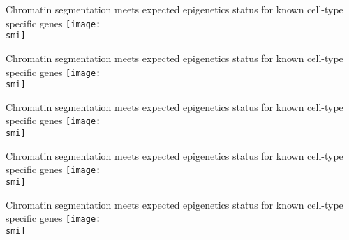 \documentclass[10pt]{beamer}
\def\smi{out/ln/updir/mw-gcthesis-oral/library.bib}
\begin{document}
    \begin{frame}{Chromatin segmentation meets expected epigenetics status for known cell-type specific genes}
      \def\smi{out/ln/updir/mw-gcthesis-oral/ink/chromatin-states/genome-view/t-lineage/2.pdf}
      \texttt{[image: \\smi]}
    \end{frame}
    \begin{frame}{Chromatin segmentation meets expected epigenetics status for known cell-type specific genes}
      \def\smi{out/ln/updir/mw-gcthesis-oral/ink/chromatin-states/genome-view/t-lineage/3.pdf}
      \texttt{[image: \\smi]}
    \end{frame}
    \begin{frame}{Chromatin segmentation meets expected epigenetics status for known cell-type specific genes}
      \def\smi{out/ln/updir/mw-gcthesis-oral/ink/chromatin-states/genome-view/t-lineage/4.pdf}
      \texttt{[image: \\smi]}
    \end{frame}
    \begin{frame}{Chromatin segmentation meets expected epigenetics status for known cell-type specific genes}
      \def\smi{out/ln/updir/mw-gcthesis-oral/ink/chromatin-states/genome-view/t-lineage/5.pdf}
      \texttt{[image: \\smi]}
    \end{frame}
    \begin{frame}{Chromatin segmentation meets expected epigenetics status for known cell-type specific genes}
      \def\smi{out/ln/updir/mw-gcthesis-oral/ink/chromatin-states/genome-view/t-lineage/6.pdf}
      \texttt{[image: \\smi]}%
    \end{frame}
\end{document}
